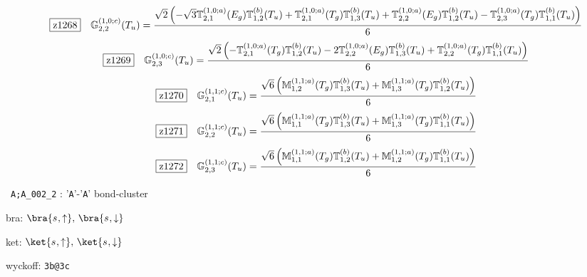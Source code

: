 \documentclass[fleqn,10pt,landscape]{jsarticle}
\begin{document}
\begin{dmath*}
\hspace*{3mm}\fbox{z1268}\quad \mathbb{G}_{2,2}^{(1,0;c)}(T_{u})=\frac{\sqrt{2} \left(- \sqrt{3} \mathbb{T}_{2,1}^{(1,0;a)}(E_{g}) \mathbb{T}_{1,2}^{(b)}(T_{u}) + \mathbb{T}_{2,1}^{(1,0;a)}(T_{g}) \mathbb{T}_{1,3}^{(b)}(T_{u}) + \mathbb{T}_{2,2}^{(1,0;a)}(E_{g}) \mathbb{T}_{1,2}^{(b)}(T_{u}) - \mathbb{T}_{2,3}^{(1,0;a)}(T_{g}) \mathbb{T}_{1,1}^{(b)}(T_{u})\right)}{6}
\end{dmath*}
\begin{dmath*}
\hspace*{3mm}\fbox{z1269}\quad \mathbb{G}_{2,3}^{(1,0;c)}(T_{u})=\frac{\sqrt{2} \left(- \mathbb{T}_{2,1}^{(1,0;a)}(T_{g}) \mathbb{T}_{1,2}^{(b)}(T_{u}) - 2 \mathbb{T}_{2,2}^{(1,0;a)}(E_{g}) \mathbb{T}_{1,3}^{(b)}(T_{u}) + \mathbb{T}_{2,2}^{(1,0;a)}(T_{g}) \mathbb{T}_{1,1}^{(b)}(T_{u})\right)}{6}
\end{dmath*}
\begin{dmath*}
\hspace*{3mm}\fbox{z1270}\quad \mathbb{G}_{2,1}^{(1,1;c)}(T_{u})=\frac{\sqrt{6} \left(\mathbb{M}_{1,2}^{(1,1;a)}(T_{g}) \mathbb{T}_{1,3}^{(b)}(T_{u}) + \mathbb{M}_{1,3}^{(1,1;a)}(T_{g}) \mathbb{T}_{1,2}^{(b)}(T_{u})\right)}{6}
\end{dmath*}
\begin{dmath*}
\hspace*{3mm}\fbox{z1271}\quad \mathbb{G}_{2,2}^{(1,1;c)}(T_{u})=\frac{\sqrt{6} \left(\mathbb{M}_{1,1}^{(1,1;a)}(T_{g}) \mathbb{T}_{1,3}^{(b)}(T_{u}) + \mathbb{M}_{1,3}^{(1,1;a)}(T_{g}) \mathbb{T}_{1,1}^{(b)}(T_{u})\right)}{6}
\end{dmath*}
\begin{dmath*}
\hspace*{3mm}\fbox{z1272}\quad \mathbb{G}_{2,3}^{(1,1;c)}(T_{u})=\frac{\sqrt{6} \left(\mathbb{M}_{1,1}^{(1,1;a)}(T_{g}) \mathbb{T}_{1,2}^{(b)}(T_{u}) + \mathbb{M}_{1,2}^{(1,1;a)}(T_{g}) \mathbb{T}_{1,1}^{(b)}(T_{u})\right)}{6}
\end{dmath*}
\vspace{5mm}

\noindent\textbullet\, \texttt{A;A_002_2} : '\texttt{A}'-'\texttt{A}' bond-cluster

\noindent\quad * bra: $\bra{s_{},\uparrow},\, \bra{s_{},\downarrow}$

\noindent\quad * ket: $\ket{s_{},\uparrow},\, \ket{s_{},\downarrow}$

\noindent\quad * wyckoff: \texttt{3b@3c}
\end{document}
